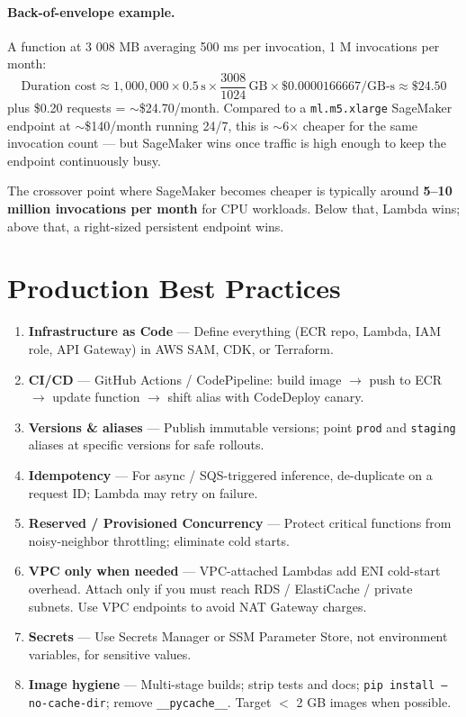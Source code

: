 \documentclass[11pt,a4paper]{article}
\begin{document}
\paragraph{Back-of-envelope example.} A function at 3 008 MB averaging 500 ms
per invocation, 1 M invocations per month:
\[
\text{Duration cost} \approx 1{,}000{,}000 \times 0.5\,\text{s}
\times \frac{3008}{1024}\,\text{GB} \times \$0.0000166667/\text{GB-s}
\approx \$24.50
\]
plus \$0.20 requests = $\sim$\$24.70/month. Compared to a \texttt{ml.m5.xlarge}
SageMaker endpoint at $\sim$\$140/month running 24/7, this is $\sim$6$\times$
cheaper for the same invocation count --- but SageMaker wins once traffic is
high enough to keep the endpoint continuously busy.

\begin{tipbox}
The crossover point where SageMaker becomes cheaper is typically around
\textbf{5--10 million invocations per month} for CPU workloads. Below that,
Lambda wins; above that, a right-sized persistent endpoint wins.
\end{tipbox}

\section{Production Best Practices}

\begin{enumerate}[leftmargin=*]
    \item \textbf{Infrastructure as Code} --- Define everything (ECR repo,
          Lambda, IAM role, API Gateway) in AWS SAM, CDK, or Terraform.
    \item \textbf{CI/CD} --- GitHub Actions / CodePipeline: build image
          $\rightarrow$ push to ECR $\rightarrow$ update function $\rightarrow$
          shift alias with CodeDeploy canary.
    \item \textbf{Versions \& aliases} --- Publish immutable versions; point
          \texttt{prod} and \texttt{staging} aliases at specific versions for
          safe rollouts.
    \item \textbf{Idempotency} --- For async / SQS-triggered inference,
          de-duplicate on a request ID; Lambda may retry on failure.
    \item \textbf{Reserved / Provisioned Concurrency} --- Protect critical
          functions from noisy-neighbor throttling; eliminate cold starts.
    \item \textbf{VPC only when needed} --- VPC-attached Lambdas add ENI
          cold-start overhead. Attach only if you must reach RDS / ElastiCache
          / private subnets. Use VPC endpoints to avoid NAT Gateway charges.
    \item \textbf{Secrets} --- Use Secrets Manager or SSM Parameter Store, not
          environment variables, for sensitive values.
    \item \textbf{Image hygiene} --- Multi-stage builds; strip tests and docs;
          \texttt{pip install --no-cache-dir}; remove \texttt{\_\_pycache\_\_}.
          Target $<$ 2 GB images when possible.
\end{enumerate}
\end{document}
